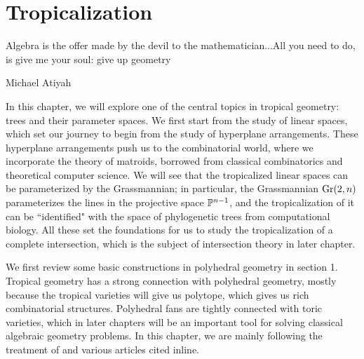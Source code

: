 \chapter{Tropicalization}
\label{chp:tropicalization}
\epigraph{
Algebra is the offer made by the devil to the mathematician...All you need to do, is give me your soul: give up geometry
}{Michael Atiyah}

In this chapter,
we will explore one of the central topics in tropical geometry:
trees and their parameter spaces.
We first start from the study of linear spaces,
which set our journey to begin from the study of hyperplane arrangements.
These hyperplane arrangements push us to the combinatorial world,
where we incorporate the theory of matroids, 
borrowed from classical combinatorics and theoretical computer science.
We will see that the tropicalized linear spaces 
can be parameterized by the Grassmannian;
in particular, the Grassmannian $\gr(2, n)$
parameterizes the lines in the projective space $\P^{n-1}$,
and the tropicalization of it 
can be ``identified" with the space of phylogenetic trees 
from computational biology. 
All these set the foundations for us to study the tropicalization of 
a complete intersection, 
which is the subject of intersection theory in later chapter.

We first review some basic constructions in polyhedral geometry in section 1.
Tropical geometry has a strong connection 
with polyhedral geometry,
mostly because the tropical varieties will give us polytope, 
which gives us rich combinatorial structures. 
Polyhedral fans are tightly connected with toric varieties,
which in later chapters will be an important tool for
solving classical algebraic geometry problems. 
In this chapter, we are mainly following the treatment of \citet{Maclagan2015} and various articles cited inline. 



	
	
	
	
	
	
	
		


	

  

